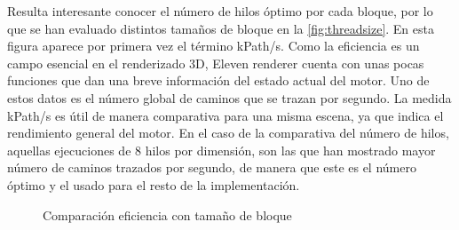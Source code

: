 Resulta interesante conocer el número de hilos óptimo por cada bloque, por lo que se han evaluado distintos tamaños de bloque en la \autoref{fig:threadsize}. En esta figura aparece por primera vez el término kPath/s. Como la eficiencia es un campo esencial en el renderizado 3D, Eleven renderer cuenta con unas pocas funciones que dan una breve información del estado actual del motor. Uno de estos datos es el número global de caminos que se trazan por segundo. La medida kPath/s es útil de manera comparativa para una misma escena, ya que indica el rendimiento general del motor. En el caso de la comparativa del número de hilos, aquellas ejecuciones de 8 hilos por dimensión, son las que han mostrado mayor número de caminos trazados por segundo, de manera que este es el número óptimo y el usado para el resto de la implementación.

\begin{figure}[H]
\centering
{}
\caption{Comparación eficiencia con tamaño de bloque}
\label{fig:threadsize}
\end{figure}


